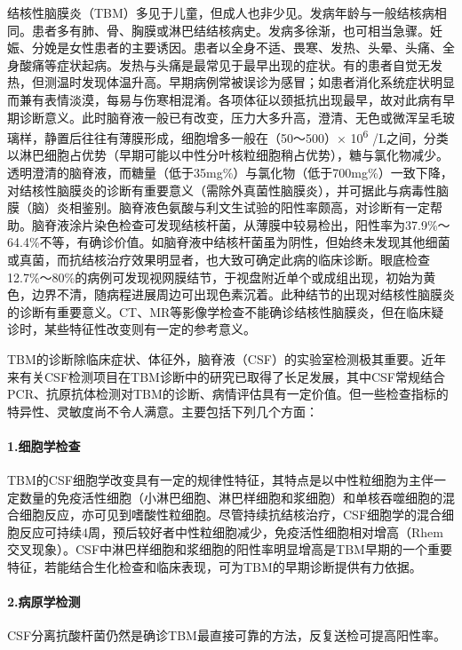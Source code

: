 结核性脑膜炎（TBM）多见于儿童，但成人也非少见。发病年龄与一般结核病相同。患者多有肺、骨、胸膜或淋巴结结核病史。发病多徐渐，也可相当急骤。妊娠、分娩是女性患者的主要诱因。患者以全身不适、畏寒、发热、头晕、头痛、全身酸痛等症状起病。发热与头痛是最常见于最早出现的症状。有的患者自觉无发热，但测温时发现体温升高。早期病例常被误诊为感冒；如患者消化系统症状明显而兼有表情淡漠，每易与伤寒相混淆。各项体征以颈抵抗出现最早，故对此病有早期诊断意义。此时脑脊液一般已有改变，压力大多升高，澄清、无色或微浑呈毛玻璃样，静置后往往有薄膜形成，细胞增多一般在（50～500）×
10\textsuperscript{6}
/L之间，分类以淋巴细胞占优势（早期可能以中性分叶核粒细胞稍占优势），糖与氯化物减少。透明澄清的脑脊液，而糖量（低于35mg\%）与氯化物（低于700mg\%）一致下降，对结核性脑膜炎的诊断有重要意义（需除外真菌性脑膜炎），并可据此与病毒性脑膜（脑）炎相鉴别。脑脊液色氨酸与利文生试验的阳性率颇高，对诊断有一定帮助。脑脊液涂片染色检查可发现结核杆菌，从薄膜中较易检出，阳性率为37.9\%～64.4\%不等，有确诊价值。如脑脊液中结核杆菌虽为阴性，但始终未发现其他细菌或真菌，而抗结核治疗效果明显者，也大致可确定此病的临床诊断。眼底检查12.7\%～80\%的病例可发现视网膜结节，于视盘附近单个或成组出现，初始为黄色，边界不清，随病程进展周边可出现色素沉着。此种结节的出现对结核性脑膜炎的诊断有重要意义。CT、MR等影像学检查不能确诊结核性脑膜炎，但在临床疑诊时，某些特征性改变则有一定的参考意义。

TBM的诊断除临床症状、体征外，脑脊液（CSF）的实验室检测极其重要。近年来有关CSF检测项目在TBM诊断中的研究已取得了长足发展，其中CSF常规结合PCR、抗原抗体检测对TBM的诊断、病情评估具有一定价值。但一些检查指标的特异性、灵敏度尚不令人满意。主要包括下列几个方面：

\paragraph{1.细胞学检查}

TBM的CSF细胞学改变具有一定的规律性特征，其特点是以中性粒细胞为主伴一定数量的免疫活性细胞（小淋巴细胞、淋巴样细胞和浆细胞）和单核吞噬细胞的混合细胞反应，亦可见到嗜酸性粒细胞。尽管持续抗结核治疗，CSF细胞学的混合细胞反应可持续4周，预后较好者中性粒细胞减少，免疫活性细胞相对增高（Rhem交叉现象）。CSF中淋巴样细胞和浆细胞的阳性率明显增高是TBM早期的一个重要特征，若能结合生化检查和临床表现，可为TBM的早期诊断提供有力依据。

\paragraph{2.病原学检测}

CSF分离抗酸杆菌仍然是确诊TBM最直接可靠的方法，反复送检可提高阳性率。

